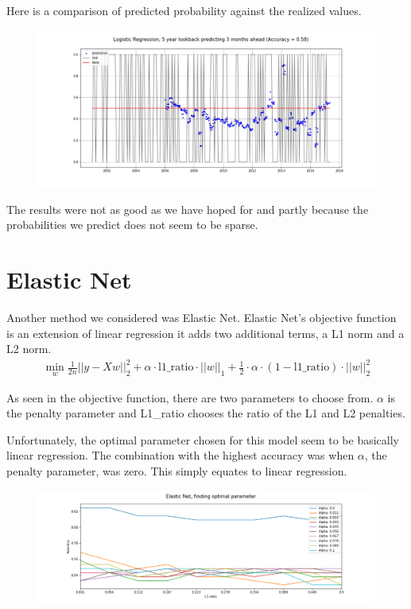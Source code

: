 \documentclass[12pt]{amsart}
\begin{document}
Here is a comparison of predicted probability against the realized values.
\begin{figure}[htb]
	\includegraphics[scale=0.5]{Logistic_regression_5year_3months_result.png}
\end{figure}
The results were not as good as we have hoped for and partly because the probabilities we predict does not seem to be sparse. 

\section*{Elastic Net}
Another method we considered was Elastic Net. Elastic Net's objective function is an extension of linear regression it adds two additional terms, a L1 norm and a L2 norm.
\begin{align*}
\min_{w} \frac{1}{2n}  ||y - Xw||^2_2+\alpha \cdot \text{l1\_ratio} \cdot ||w||_1 + \frac{1}{2} \cdot \alpha \cdot (1 - \text{l1\_ratio}) \cdot ||w||^2_2
\end{align*}

As seen in the objective function, there are two parameters to choose from. $\alpha$ is the penalty parameter and L1\_ratio chooses the ratio of the L1 and L2 penalties.  

Unfortunately, the optimal parameter chosen for this model seem to be basically linear regression. The combination with the highest accuracy was when $\alpha$, the penalty parameter, was zero. This simply equates to linear regression.
\begin{figure}[htb]
	\includegraphics[scale=0.5]{Elastic_regression_cant_beat_linear_reg.png}
\end{figure}
\end{document}
